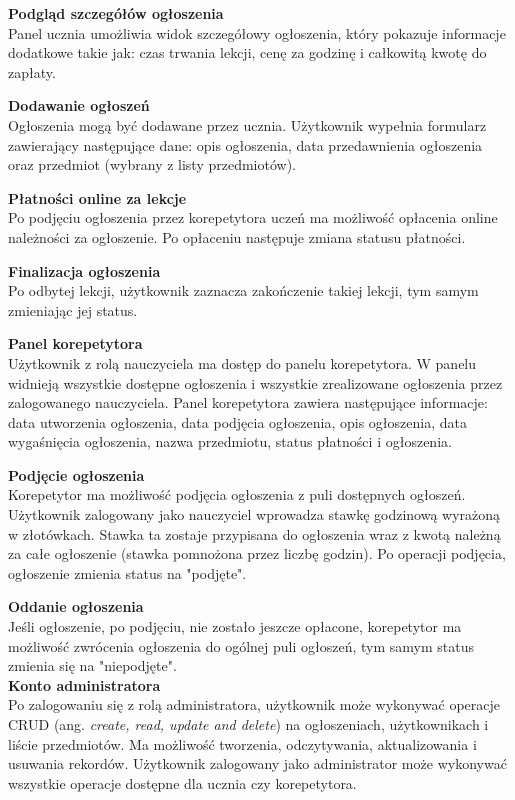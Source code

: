 \documentclass[12pt]{article}
\numberwithin{figure}{section}
\begin{document}
\begin{sloppypar}
\noindent
\textbf{Podgląd szczegółów ogłoszenia}\\
\indent
Panel ucznia umożliwia widok szczegółowy ogłoszenia, który pokazuje informacje dodatkowe takie jak: czas trwania lekcji, cenę za godzinę i całkowitą kwotę do zapłaty. 

\noindent
\textbf{Dodawanie ogłoszeń}\\
\indent
Ogłoszenia mogą być dodawane przez ucznia. Użytkownik wypełnia formularz zawierający następujące dane: opis ogłoszenia, data przedawnienia ogłoszenia oraz przedmiot (wybrany z listy przedmiotów). 

\noindent
\textbf{Płatności online za lekcje}\\
\indent
Po podjęciu ogłoszenia przez korepetytora uczeń ma możliwość opłacenia online należności za ogłoszenie. Po opłaceniu następuje zmiana statusu płatności. 

\noindent
\textbf{Finalizacja ogłoszenia}\\
\indent
Po odbytej lekcji, użytkownik zaznacza zakończenie takiej lekcji, tym samym zmieniając jej status.

\noindent
\textbf{Panel korepetytora}\\
\indent
Użytkownik z rolą nauczyciela ma dostęp do panelu korepetytora. W panelu widnieją wszystkie dostępne ogłoszenia i wszystkie zrealizowane ogłoszenia przez zalogowanego nauczyciela. Panel korepetytora zawiera następujące informacje: data utworzenia ogłoszenia, data podjęcia ogłoszenia, opis ogłoszenia, data wygaśnięcia ogłoszenia, nazwa przedmiotu, status płatności i ogłoszenia.

\noindent
\textbf{Podjęcie ogłoszenia}\\
\indent
Korepetytor ma możliwość podjęcia ogłoszenia z puli dostępnych ogłoszeń. Użytkownik zalogowany jako nauczyciel wprowadza stawkę godzinową wyrażoną w złotówkach. Stawka ta zostaje przypisana do ogłoszenia wraz z kwotą należną za całe ogłoszenie (stawka pomnożona przez liczbę godzin). Po operacji podjęcia, ogłoszenie zmienia status na "podjęte".

\noindent
\textbf{Oddanie ogłoszenia}\\
\indent
Jeśli ogłoszenie, po podjęciu, nie zostało jeszcze opłacone, korepetytor ma możliwość zwrócenia ogłoszenia do ogólnej puli ogłoszeń, tym samym status zmienia się na "niepodjęte".\\

\noindent
\textbf{Konto administratora}\\
\indent
Po zalogowaniu się z rolą administratora, użytkownik może wykonywać operacje CRUD (ang. \textit{create, read, update and delete}) na ogłoszeniach, użytkownikach i liście przedmiotów. Ma możliwość tworzenia, odczytywania, aktualizowania i usuwania rekordów. Użytkownik zalogowany jako administrator może wykonywać wszystkie operacje dostępne dla ucznia czy korepetytora.


\end{sloppypar}
\end{document}
